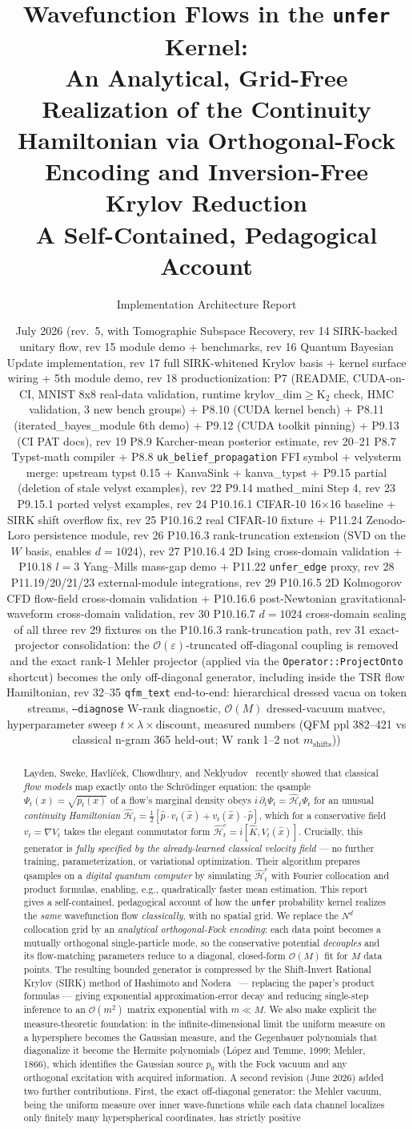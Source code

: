 \documentclass[11pt, a4paper]{article}
\title{\textbf{Wavefunction Flows in the \texttt{unfer} Kernel:\\
An Analytical, Grid-Free Realization of the Continuity Hamiltonian
via Orthogonal-Fock Encoding and Inversion-Free Krylov Reduction}\\[4pt]
\large A Self-Contained, Pedagogical Account}
\author{Implementation Architecture Report}
\date{July 2026 (rev.\ 5, with Tomographic Subspace Recovery, rev 14 SIRK-backed unitary flow, rev 15 module demo + benchmarks, rev 16 Quantum Bayesian Update implementation, rev 17 full SIRK-whitened Krylov basis + kernel surface wiring + 5th module demo, rev 18 productionization: P7 (README, CUDA-on-CI, MNIST 8x8 real-data validation, runtime krylov\_dim$\ge$K$_2$ check, HMC validation, 3 new bench groups) + P8.10 (CUDA kernel bench) + P8.11 (iterated\_bayes\_module 6th demo) + P9.12 (CUDA toolkit pinning) + P9.13 (CI PAT docs), rev 19 P8.9 Karcher-mean posterior estimate, rev 20--21 P8.7 Typst-math compiler + P8.8 \texttt{uk\_belief\_propagation} FFI symbol + velysterm merge: upstream typst 0.15 + KanvaSink + kanva\_typst + P9.15 partial (deletion of stale velyst examples), rev 22 P9.14 mathed\_mini Step 4, rev 23 P9.15.1 ported velyst examples, rev 24 P10.16.1 CIFAR-10 16$\times$16 baseline + SIRK shift overflow fix, rev 25 P10.16.2 real CIFAR-10 fixture + P11.24 Zenodo-Loro persistence module, rev 26 P10.16.3 rank-truncation extension (SVD on the $W$ basis, enables $d=1024$), rev 27 P10.16.4 2D Ising cross-domain validation + P10.18 $l=3$ Yang--Mills mass-gap demo + P11.22 \texttt{unfer\_edge} proxy, rev 28 P11.19/20/21/23 external-module integrations, rev 29 P10.16.5 2D Kolmogorov CFD flow-field cross-domain validation + P10.16.6 post-Newtonian gravitational-waveform cross-domain validation, rev 30 P10.16.7 $d=1024$ cross-domain scaling of all three rev 29 fixtures on the P10.16.3 rank-truncation path, rev 31 exact-projector consolidation: the $\mathcal{O}(\varepsilon)$-truncated off-diagonal coupling is removed and the exact rank-1 Mehler projector (applied via the \texttt{Operator::ProjectOnto} shortcut) becomes the only off-diagonal generator, including inside the TSR flow Hamiltonian, rev 32--35 \texttt{qfm\_text} end-to-end: hierarchical dressed vacua on token streams, \texttt{--diagnose} W-rank diagnostic, $\mathcal{O}(M)$ dressed-vacuum matvec, hyperparameter sweep $t\times\lambda\times\mathrm{discount}$, measured numbers (QFM ppl 382--421 vs classical n-gram 365 held-out; W rank 1--2 not $m_\mathrm{shifts}$))}
\newcommand{\Hgen}{\hat{\mathcal{H}}}
\newcommand{\Kop}{\hat{K}}
\begin{document}
\maketitle

\begin{abstract}
Layden, Sweke, Havl\'i\v{c}ek, Chowdhury, and Neklyudov~\cite{Layden2025}
recently showed that classical \emph{flow models} map exactly onto the
Schr\"odinger equation: the qsample $\Psi_t(x)=\sqrt{p_t(x)}$ of a flow's
marginal density obeys $i\,\partial_t\Psi_t=\Hgen_t\Psi_t$ for an unusual
\emph{continuity Hamiltonian} $\Hgen_t=\tfrac12[\hat p\cdot v_t(\hat x)+
v_t(\hat x)\cdot\hat p]$, which for a conservative field $v_t=\nabla V_t$
takes the elegant commutator form $\Hgen_t^c=i[\Kop,V_t(\hat x)]$. Crucially,
this generator is \emph{fully specified by the already-learned classical
velocity field} --- no further training, parameterization, or variational
optimization. Their algorithm prepares qsamples on a \emph{digital quantum
computer} by simulating $\Hgen_t^c$ with Fourier collocation and product
formulas, enabling, e.g., quadratically faster mean estimation. This report
gives a self-contained, pedagogical account of how the \texttt{unfer}
probability kernel realizes the \emph{same} wavefunction flow
\emph{classically}, with no spatial grid. We replace the $N^d$ collocation
grid by an \emph{analytical orthogonal-Fock encoding}: each data point becomes
a mutually orthogonal single-particle mode, so the conservative potential
\emph{decouples} and its flow-matching parameters reduce to a diagonal,
closed-form $\mathcal{O}(M)$ fit for $M$ data points. The resulting bounded
generator is compressed by the Shift-Invert Rational Krylov (SIRK) method of
Hashimoto and Nodera~\cite{Hashimoto2019} --- replacing the paper's product
formulas --- giving exponential approximation-error decay and reducing
single-step inference to an $\mathcal{O}(m^2)$ matrix exponential with
$m\ll M$. We also make explicit the measure-theoretic foundation: in the
infinite-dimensional limit the uniform measure on a hypersphere becomes the
Gaussian measure, and the Gegenbauer polynomials that diagonalize it become
the Hermite polynomials (L\'opez and Temme, 1999; Mehler, 1866), which
identifies the Gaussian source $p_0$ with the Fock vacuum and any orthogonal
excitation with acquired information. A second revision (June 2026) added
two further contributions. First, the exact off-diagonal generator: the Mehler vacuum,
being the uniform measure over inner wave-functions while each data channel
localizes only finitely many hyperspherical coordinates, has strictly positive

\end{abstract}
\end{document}

